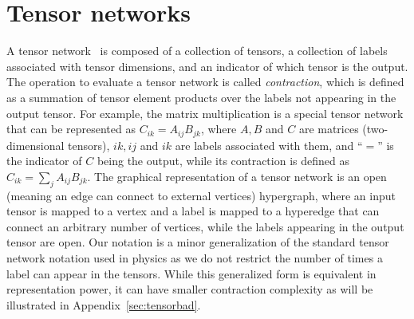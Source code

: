 \documentclass[onefignum, onetabnum]{siamart190516}
\newcommand{\<}{\langle}
\renewcommand{\>}{\rangle}
\newcommand{\App}[1]{Appendix~\ref{#1}}
\newcounter{example}
\begin{document}
\section{Tensor networks}\label{sec:tn}
A tensor network~\cite{Cirac2020, Orus2014} is composed of a collection of tensors, a collection of labels associated with tensor dimensions, and an indicator of which tensor is the output.
The operation to evaluate a tensor network is called \textit{contraction}, which is defined as a summation of tensor element products over the labels not appearing in the output tensor.
For example, the matrix multiplication is a special tensor network that can be represented as $C_{ik} = A_{ij}B_{jk}$, where $A, B$ and $C$ are matrices (two-dimensional tensors), $ik,ij$ and $ik$ are labels associated with them, and ``$=$'' is the indicator of $C$ being the output, while its contraction is defined as $C_{ik} = \sum_j A_{ij}B_{jk}$.
The graphical representation of a tensor network is an open (meaning an edge can connect to external vertices) hypergraph, where an input tensor is mapped to a vertex and a label is mapped to a hyperedge that can connect an arbitrary number of vertices, while the labels appearing in the output tensor are open.
Our notation is a minor generalization of the standard tensor network notation used in physics as we do not restrict the number of times a label can appear in the tensors. 
While this generalized form is equivalent in representation power, it can have smaller contraction complexity as will be illustrated in \App{sec:tensorbad}.
\end{document}
